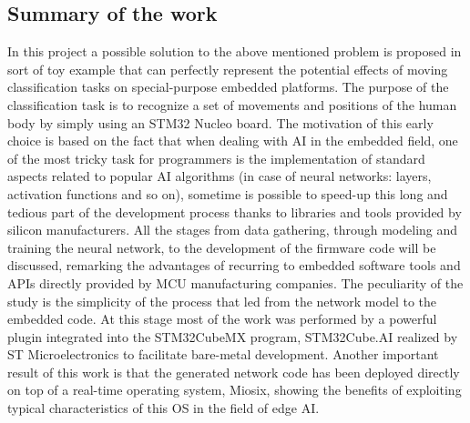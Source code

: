 \subsection{Summary of the work}
In this project a possible solution to the above mentioned problem is proposed in sort of toy example that can perfectly represent the potential effects of moving classification tasks on special-purpose embedded platforms. The purpose of the classification task is to recognize a set of movements and positions of the human body by simply using an STM32 Nucleo board. The motivation of this early choice is based on the fact that when dealing with AI in the embedded field, one of the most tricky task for programmers is the implementation of standard aspects related to popular AI algorithms (in case of neural networks: layers, activation functions and so on), sometime is possible to speed-up this long and tedious part of the development process thanks to libraries and tools provided by silicon manufacturers. All the stages from data gathering, through modeling and training the neural network, to the development of the firmware code will be discussed, remarking the advantages of recurring to embedded software tools and APIs directly provided by MCU manufacturing companies. The peculiarity of the study is the simplicity of the process that led from the network model to the embedded code. At this stage most of the work was performed by a powerful plugin integrated into the STM32CubeMX program, STM32Cube.AI realized by ST Microelectronics to facilitate bare-metal development. Another important result of this work is that the generated network code has been deployed directly on top of a real-time operating system, Miosix, showing the benefits of exploiting typical characteristics of this OS in the field of edge AI.   
\pagebreak

